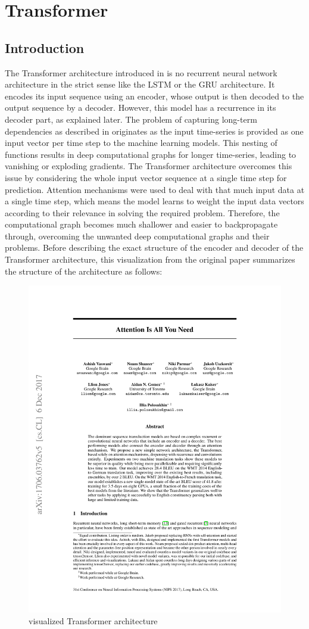 \documentclass[draft,final]{vutinfth} %
\begin{document}
    \section{Transformer} \label{transformer}

    \subsection{Introduction}
    The Transformer architecture introduced in \cite{Transformer} is no recurrent neural network architecture in the strict sense like the LSTM or the GRU architecture.
    It encodes its input sequence using an encoder, whose output is then decoded to the output sequence by a decoder.
    However, this model has a recurrence in its decoder part, as explained later.
    The problem of capturing long-term dependencies as described in  originates as the input time-series is provided as one input vector per time step to the machine learning models.
    This nesting of functions results in deep computational graphs for longer time-series, leading to vanishing or exploding gradients.
    The Transformer architecture overcomes this issue by considering the whole input vector sequence at a single time step for prediction.
    Attention mechanisms were used to deal with that much input data at a single time step, which means the model learns to weight the input data vectors according to their relevance in solving the required problem.
    Therefore, the computational graph becomes much shallower and easier to backpropagate through, overcoming the unwanted deep computational graphs and their problems.
    Before describing the exact structure of the encoder and decoder of the Transformer architecture, this visualization from the original paper summarizes the structure of the architecture as follows:
    \begin{figure}[H]
        \centering{}
        \includegraphics[page=3,width=0.6\linewidth,trim={196 398 196 71},clip]{literature/attention_is_all_you_need.pdf}
        \caption{visualized Transformer architecture \cite[p. 3]{Transformer}}
        \label{fig:transformer_vis}
    \end{figure}
\end{document}
